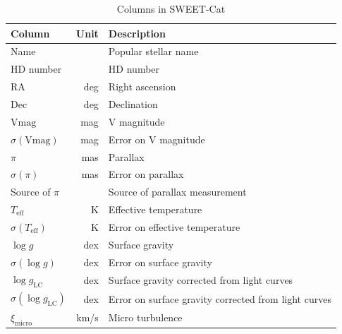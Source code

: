 \begin{table}[htb!]
    \caption{Columns in SWEET-Cat}
    \label{tab:sweetcat}
    \centering
    \begin{tabular}{lrl}
      \hline\hline
      Column                         & Unit      & Description \\
      \hline
      Name                           &           & Popular stellar name                                 \\
      HD number                      &           & HD number                                            \\
      RA                             & \si{deg}  & Right ascension                                      \\
      Dec                            & \si{deg}  & Declination                                          \\
      $\mathrm{Vmag}$                & \si{mag}  & V magnitude                                          \\
      $\sigma(\mathrm{Vmag})$        & \si{mag}  & Error on V magnitude                                 \\
      $\pi$                          & \si{mas}  & Parallax                                             \\
      $\sigma(\pi)$                  & \si{mas}  & Error on parallax                                    \\
      Source of $\pi$                &           & Source of parallax measurement                       \\
      $T_\mathrm{eff}$               & \si{K}    & Effective temperature                                \\
      $\sigma(T_\mathrm{eff})$       & \si{K}    & Error on effective temperature                       \\
      $\log g$                       & \si{dex}  & Surface gravity                                      \\
      $\sigma(\log g)$               & \si{dex}  & Error on surface gravity                             \\
      $\log g_{\mathrm{LC}}$         & \si{dex}  & Surface gravity corrected from light curves          \\
      $\sigma(\log g_{\mathrm{LC}})$ & \si{dex}  & Error on surface gravity corrected from light curves \\
      $\xi_\mathrm{micro}$           & \si{km/s} & Micro turbulence                                     \\

\end{tabular}
\end{table}
